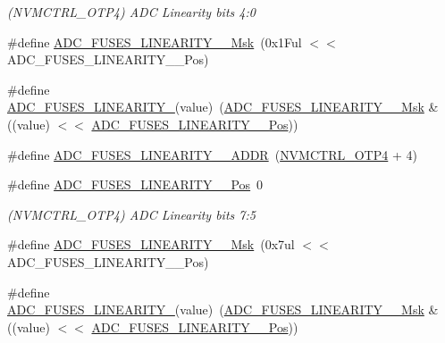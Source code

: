 \begin{DoxyCompactItemize}
\begin{DoxyCompactList}\small\item\em (N\+V\+M\+C\+T\+R\+L\+\_\+\+O\+T\+P4) A\+DC Linearity bits 4\+:0 \end{DoxyCompactList}\item 
\#define \mbox{\hyperlink{group__fuses__api_ga6488772af94070cb940e38c5a9907f75}{A\+D\+C\+\_\+\+F\+U\+S\+E\+S\+\_\+\+L\+I\+N\+E\+A\+R\+I\+T\+Y\+\_\+\_\+\+Msk}}~(0x1\+Ful $<$$<$ A\+D\+C\+\_\+\+F\+U\+S\+E\+S\+\_\+\+L\+I\+N\+E\+A\+R\+I\+T\+Y\+\_\+\_\+\+Pos)
\item 
\#define \mbox{\hyperlink{group__fuses__api_gaa518374cbe69a5df6b31b542da885848}{A\+D\+C\+\_\+\+F\+U\+S\+E\+S\+\_\+\+L\+I\+N\+E\+A\+R\+I\+T\+Y\+\_}}(value)~(\mbox{\hyperlink{group__fuses__api_ga6488772af94070cb940e38c5a9907f75}{A\+D\+C\+\_\+\+F\+U\+S\+E\+S\+\_\+\+L\+I\+N\+E\+A\+R\+I\+T\+Y\+\_\+\_\+\+Msk}} \& ((value) $<$$<$ \mbox{\hyperlink{group__fuses__api_gaa1879ab54367d19c2a0996cee7fcbb0a}{A\+D\+C\+\_\+\+F\+U\+S\+E\+S\+\_\+\+L\+I\+N\+E\+A\+R\+I\+T\+Y\+\_\+\_\+\+Pos}}))
\item 
\#define \mbox{\hyperlink{group__fuses__api_gaea300217e39f9fc02685547c8d89f6b4}{A\+D\+C\+\_\+\+F\+U\+S\+E\+S\+\_\+\+L\+I\+N\+E\+A\+R\+I\+T\+Y\+\_\+\_\+\+A\+D\+DR}}~(\mbox{\hyperlink{group___s_a_m_d21_j18_a__base_ga138b4aca5a0446a745fe143c1dca8165}{N\+V\+M\+C\+T\+R\+L\+\_\+\+O\+T\+P4}} + 4)
\item 
\#define \mbox{\hyperlink{group__fuses__api_ga7b2cdd7d4d88223dff349b08725abdb3}{A\+D\+C\+\_\+\+F\+U\+S\+E\+S\+\_\+\+L\+I\+N\+E\+A\+R\+I\+T\+Y\+\_\+\_\+\+Pos}}~0
\begin{DoxyCompactList}\small\item\em (N\+V\+M\+C\+T\+R\+L\+\_\+\+O\+T\+P4) A\+DC Linearity bits 7\+:5 \end{DoxyCompactList}\item 
\#define \mbox{\hyperlink{group__fuses__api_ga8092b3ae5649eb642bedf679b326157e}{A\+D\+C\+\_\+\+F\+U\+S\+E\+S\+\_\+\+L\+I\+N\+E\+A\+R\+I\+T\+Y\+\_\+\_\+\+Msk}}~(0x7ul $<$$<$ A\+D\+C\+\_\+\+F\+U\+S\+E\+S\+\_\+\+L\+I\+N\+E\+A\+R\+I\+T\+Y\+\_\+\_\+\+Pos)
\item 
\#define \mbox{\hyperlink{group__fuses__api_ga36b36b36eb62a16285f7cd406f88d6c4}{A\+D\+C\+\_\+\+F\+U\+S\+E\+S\+\_\+\+L\+I\+N\+E\+A\+R\+I\+T\+Y\+\_}}(value)~(\mbox{\hyperlink{group__fuses__api_ga8092b3ae5649eb642bedf679b326157e}{A\+D\+C\+\_\+\+F\+U\+S\+E\+S\+\_\+\+L\+I\+N\+E\+A\+R\+I\+T\+Y\+\_\+\_\+\+Msk}} \& ((value) $<$$<$ \mbox{\hyperlink{group__fuses__api_ga7b2cdd7d4d88223dff349b08725abdb3}{A\+D\+C\+\_\+\+F\+U\+S\+E\+S\+\_\+\+L\+I\+N\+E\+A\+R\+I\+T\+Y\+\_\+\_\+\+Pos}}))

\end{DoxyCompactItemize}
